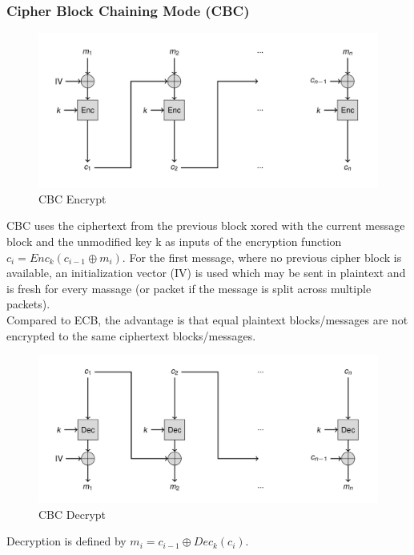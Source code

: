 \subsubsection{Cipher Block Chaining Mode (CBC)}
\begin{figure}[H]
  \centering
  \includegraphics[width=.8\textwidth]{figures/cbc_encrypt.png}
  \caption{CBC Encrypt}\label{fig:cbc_encrypt}
\end{figure}
CBC uses the ciphertext from the previous block xored with the current message block and the unmodified key k as inputs of the encryption function $c_i = Enc_k(c_{i-1} \oplus m_i)$.
For the first message, where no previous cipher block is available, an initialization vector (IV) is used which may be sent in plaintext and is fresh for every massage (or packet if the message is split across multiple packets).\\
Compared to ECB, the advantage is that equal plaintext blocks/messages are not encrypted to the same ciphertext blocks/messages.
\begin{figure}[H]
  \centering
  \includegraphics[width=.8\textwidth]{figures/cbc_decrypt.png}
  \caption{CBC Decrypt}
\end{figure}
Decryption is defined by $m_i = c_{i-1} \oplus Dec_k(c_i)$.

